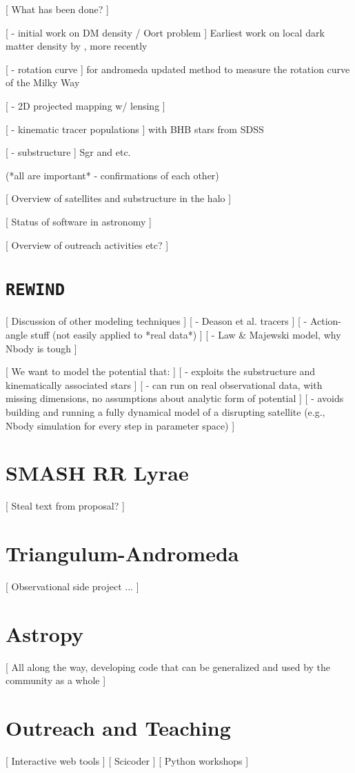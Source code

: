 \documentclass[letterpaper,12pt,preprint]{aastex}
\begin{document}
[ What has been done? ]

[ - initial work on DM density / Oort problem ]
	Earliest work on local dark matter density by \cite{oort32}, more recently \cite{bovy12}

[ - rotation curve ]
	\cite{rubin70} for andromeda
	updated method to measure the rotation curve of the Milky Way \cite{merrifield92}
	
[ - 2D projected mapping w/ lensing ]

[ - kinematic tracer populations ]
	\cite{deason12} with BHB stars from SDSS

[ - substructure ]
	Sgr and etc.

(*all are important* - confirmations of each other)

[ Overview of satellites and substructure in the halo ]

[ Status of software in astronomy ]

[ Overview of outreach activities etc? ]

\section{\texttt{REWIND}}

[ Discussion of other modeling techniques ]
[ - Deason et al. tracers ]
[ - Action-angle stuff (not easily applied to *real data*) ]
[ - Law \& Majewski model, why Nbody is tough ]

[ We want to model the potential that: ]
[ - exploits the substructure and kinematically associated stars ]
[ - can run on real observational data, with missing dimensions, no assumptions about analytic form of potential ]
[ - avoids building and running a fully dynamical model of a disrupting satellite (e.g., Nbody simulation for every step in parameter space) ]

\section{SMASH RR Lyrae}

[ Steal text from proposal? ]

\section{Triangulum-Andromeda}

[ Observational side project ... ]

\section{Astropy}

[ All along the way, developing code that can be generalized and used by the community as a whole ]

\section{Outreach and Teaching}

[ Interactive web tools ]
[ Scicoder ]
[ Python workshops ]



\end{document}
